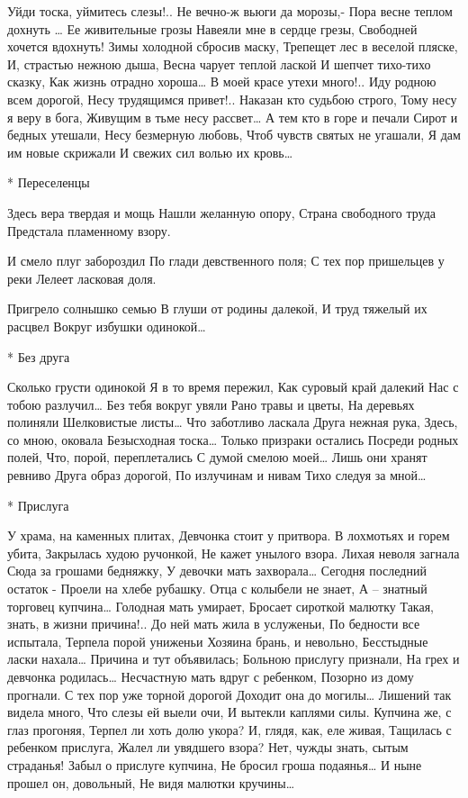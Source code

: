 Уйди тоска, уймитесь слезы!..
Не вечно-ж вьюги да морозы,-
Пора весне теплом дохнуть …
Ее живительные грозы
Навеяли мне в сердце грезы,
Свободней хочется вдохнуть!
Зимы холодной сбросив маску,
Трепещет лес в веселой пляске,
И, страстью нежною дыша,
Весна чарует теплой лаской
И шепчет тихо-тихо сказку,
Как жизнь отрадно хороша…
В моей красе утехи много!..
Иду родною всем дорогой,
Несу трудящимся привет!..
Наказан кто судьбою строго,
Тому несу я веру в бога,
Живущим в тьме несу рассвет…
А тем кто в горе и печали
Сирот и бедных утешали,
Несу безмерную любовь,
Чтоб чувств святых не угашали,
Я дам им новые скрижали
И свежих сил волью их кровь…


* Переселенцы

Здесь вера твердая и мощь
Нашли желанную опору,
Страна свободного труда
Предстала пламенному взору.

И смело плуг забороздил
По глади девственного поля;
С тех пор пришельцев у реки
Лелеет ласковая доля.

Пригрело солнышко семью
В глуши от родины далекой,
И труд тяжелый их расцвел
Вокруг избушки одинокой…



* Без друга

Сколько грусти одинокой
Я в то время пережил,
Как суровый край далекий
Нас с тобою разлучил…
Без тебя вокруг увяли
Рано травы и цветы,
На деревьях полиняли
Шелковистые листы…
Что заботливо ласкала
Друга нежная рука,
Здесь, со мною, оковала
Безысходная тоска…
Только призраки остались
Посреди родных полей,
Что, порой, переплетались
С думой смелою моей…
Лишь они хранят ревниво
Друга образ дорогой,
По излучинам и нивам
Тихо следуя за мной…


* Прислуга

У храма, на каменных плитах,
Девчонка стоит у притвора.
В лохмотьях и горем убита,
Закрылась худою ручонкой,
Не кажет унылого взора.
Лихая неволя загнала
Сюда за грошами бедняжку,
У девочки мать захворала…
Сегодня последний остаток -
Проели на хлебе рубашку.
Отца с колыбели не знает,
А – знатный торговец купчина…
Голодная мать умирает,
Бросает сироткой малютку
Такая, знать, в жизни причина!..
До ней мать жила в услуженьи,
По бедности все испытала,
Терпела порой униженьи
Хозяина брань, и невольно,
Бесстыдные ласки нахала…
Причина и тут объявилась;
Больною прислугу признали,
На грех и девчонка родилась…
Несчастную мать вдруг с ребенком,
Позорно из дому прогнали.
С тех пор уже торной дорогой
Доходит она до могилы…
Лишений так видела много,
Что слезы ей выели очи,
И вытекли каплями силы.
Купчина же, с глаз прогоняя,
Терпел ли хоть долю укора?
И, глядя, как, еле живая,
Тащилась с ребенком прислуга,
Жалел ли увядшего взора?
Нет, чужды знать, сытым страданья!
Забыл о прислуге купчина,
Не бросил гроша подаянья…
И ныне прошел он, довольный,
Не видя малютки кручины…



